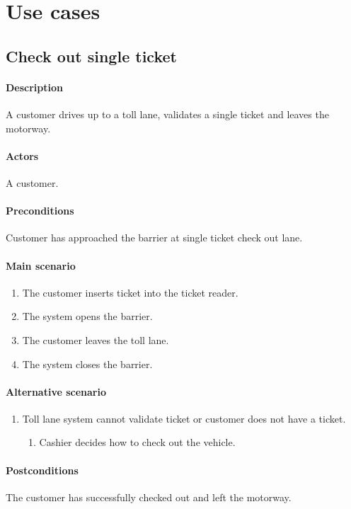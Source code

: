
\section{Use cases}
\subsection{Check out single ticket}
\paragraph{Description}
A customer drives up to a toll lane, validates a single ticket and leaves the motorway. 
\paragraph{Actors}
A customer.
\paragraph{Preconditions}
Customer has approached the barrier at single ticket check out lane. 
\paragraph{Main scenario}
\begin{enumerate}
\item The customer inserts ticket into the ticket reader.
\item The system opens the  barrier.
\item The customer leaves the toll lane.
\item The system closes the barrier.
\end{enumerate}
\paragraph{Alternative scenario}
\begin{enumerate}
\item Toll lane system cannot validate ticket or customer does not have a ticket.
\begin{enumerate}
\item Cashier decides how to check out the vehicle.
\end{enumerate}
\end{enumerate}
\paragraph{Postconditions}
The customer has successfully checked out and left the motorway.
